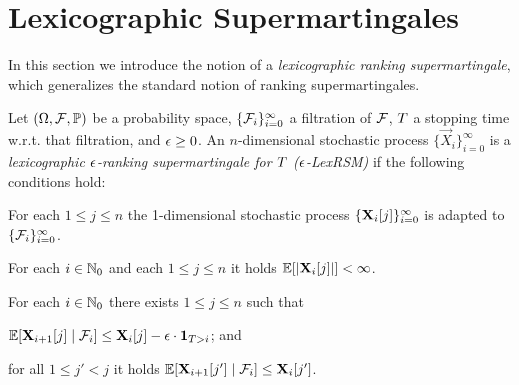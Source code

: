 \section{Lexicographic Supermartingales}
\label{sec:lexicographic}

In this section we introduce the notion of a \emph{lexicographic ranking 
supermartingale}, which generalizes the standard notion of ranking 
supermartingales.

\begin{definition}
Let $(\Omega,\mathcal{F},\mathbb{P})$ be a probability space, 
$\{\mathcal{F}_i\}_{i=0}^{\infty}$ a filtration of $\mathcal{F}$, $T$ a stopping 
time w.r.t. that filtration, and 
$\epsilon\geq 0$. 
An $n$-dimensional stochastic process $\{\vec{X}_{i}\}_{i=0}^{\infty}$ is a 
\emph{lexicographic $\epsilon$-ranking supermartingale for $T$ 
($\epsilon$-LexRSM)} if the 
following 
conditions hold:
\begin{compactenum}
\item For each $1\leq j \leq n$ the 1-dimensional stochastic process 
$\{\mathbf{X}_{i}[j]\}_{i=0}^{\infty}$ is adapted to 
$\{\mathcal{F}_i\}_{i=0}^{\infty}$.
\item For each $i\in \mathbb{N}_0$ and each $1\leq j \leq n$ it holds 
$\mathbb{E}[|\mathbf{X}_{i}[j]|]<\infty$.
\item For each $i\in \mathbb{N}_0$ there exists $1\leq j \leq n$ such that
\begin{compactitem}
	\item $\mathbb{E}[\mathbf{X}_{i+1}[j]\mid \mathcal{F}_i]\leq\mathbf{X}_{i}[j] - 
	\epsilon\cdot \mathbf{1}_{T > i} $; and
	\item for all $1 \leq j' < j$ it holds $\mathbb{E}[\mathbf{X}_{i+1}[j']\mid 
	\mathcal{F}_i]\leq\mathbf{X}_{i}[j']$.
\end{compactitem}
\end{compactenum}
\end{definition}